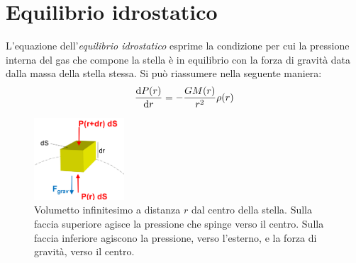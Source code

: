 \section{Equilibrio idrostatico}\label{sec:equilibrio-idrostatico}
L'equazione dell'\emph{equilibrio idrostatico} esprime la condizione per cui la pressione interna del gas che compone la stella è in equilibrio con la forza di gravità data dalla massa della stella stessa. Si può riassumere nella seguente maniera:
\begin{equation}\label{eq:equilibrio-idrostatico}
    \dfrac{\mathop{\mathrm{{}d}}\mathopen{} P(r)}{\mathop{\mathrm{{}d}}\mathopen{} r} = -\dfrac{G M(r)}{r^2} \rho(r)
\end{equation}

\begin{figure}
\centering
\includegraphics[width=0.3\textwidth]{immagini/equilibrio-idrostatico.png}
\caption{Volumetto infinitesimo a distanza $r$ dal centro della stella. Sulla faccia superiore agisce la pressione che spinge verso il centro. Sulla faccia inferiore agiscono la pressione, verso l'esterno, e la forza di gravità, verso il centro.}
\label{fig:equilibrio-idrostatico}
\end{figure}

